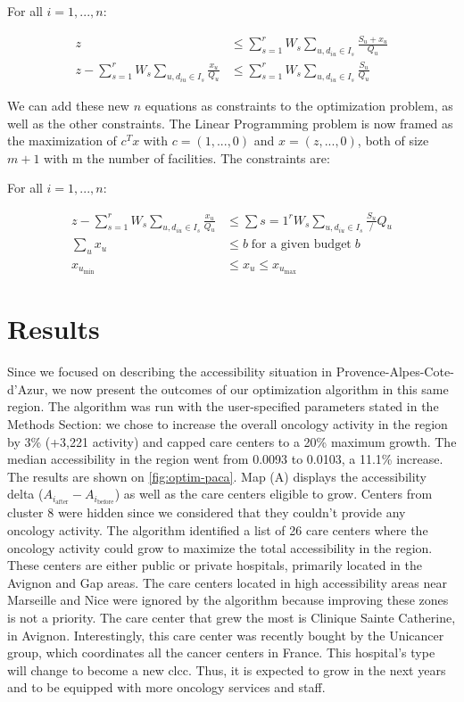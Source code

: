 For all $i=1, ... ,n$:

\begin{align*}
    z                                                              & \leq \sum_{s=1}^{r} W_s \sum_{u, d_{iu} \in I_s} \frac{S_u + x_u}{Q_u} \\
    z - \sum_{s=1}^{r} W_s \sum_{u,d_{iu} \in I_s} \frac{x_u}{Q_u} & \leq \sum_{s=1}^{r} W_s \sum_{u,d_{iu} \in I_s} \frac{S_u}{Q_u}
\end{align*}

We can add these new $n$ equations as constraints to the optimization problem,
as well as the other constraints. The Linear Programming problem is now framed
as the maximization of $c^T x$ with $c=(1, ... ,0)$ and $x=(z, ... ,0)$, both of
size $m+1$ with m the number of facilities. The constraints are:

For all $i=1, ... ,n$:

\begin{align*}
    z - \sum_{s=1}^{r} W_s \sum_{u,d_{iu} \in I_s} \frac{x_u}{Q_u} & \leq \sum{s=1}^{r} W_s \sum_{u,d_{iu} \in I_s} \frac{S_u}/{Q_u} \\
    \sum_{u} x_u                                                   & \leq b \; \text{for a given budget} \; b                        \\
    x_{u_\text{min}}                                               & \leq x_u \leq x_{u_\text{max}}
\end{align*}

\section{Results}

Since we focused on describing the accessibility situation in
Provence-Alpes-Cote-d'Azur, we now present the outcomes of our optimization
algorithm in this same region. The algorithm was run with the user-specified
parameters stated in the Methods Section: we chose to increase the overall
oncology activity in the region by 3\% (+3,221 activity) and capped care centers
to a 20\% maximum growth. The median accessibility in the region went from
0.0093 to 0.0103, a 11.1\% increase. The results are shown on
\cref{fig:optim-paca}. Map (A) displays the accessibility delta
($A_{i_\text{after}} - A_{i_\text{before}}$) as well as the care centers
eligible to grow. Centers from cluster 8 were hidden since we considered that
they couldn't provide any oncology activity. The algorithm identified a list of
26 care centers where the oncology activity could grow to maximize the total
accessibility in the region. These centers are either public or private
hospitals, primarily located in the Avignon and Gap areas. The care centers
located in high accessibility areas near Marseille and Nice were ignored by the
algorithm because improving these zones is not a priority. The care center that
grew the most is Clinique Sainte Catherine, in Avignon. Interestingly, this care
center was recently bought by the Unicancer group, which coordinates all the
cancer centers in France. This hospital's type will change to become a new
\ac{clcc}. Thus, it is expected to grow in the next years and to be equipped
with more oncology services and staff.

